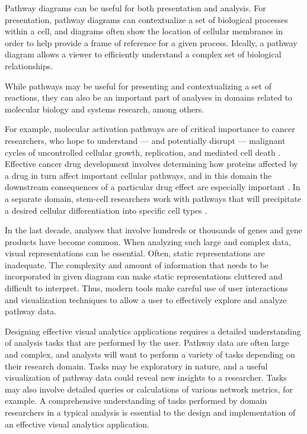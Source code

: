 \documentclass{egpubl}
\begin{document}

Pathway diagrams can be useful for both presentation and analysis.
For presentation, pathway diagrams can contextualize a set of biological processes within a cell, and diagrams often show the location of cellular membranes in order to help provide a frame of reference for a given process.
Ideally, a pathway diagram allows a viewer to efficiently understand a complex set of biological relationships.


While pathways may be useful for presenting and contextualizing a set of reactions, they can also be an important part of analyses in domains related to molecular biology and systems research, among others.

For example, molecular activation pathways are of critical importance to cancer researchers, who hope to understand --- and potentially disrupt --- malignant cycles of uncontrolled cellular growth, replication, and mediated cell death \cite{cairns2011regulation}.
Effective cancer drug development involves determining how proteins affected by a drug in turn affect important cellular pathways, and in this domain the downstream consequences of a particular drug effect are especially important \cite{luo2003targeting}.
In a separate domain, stem-cell researchers work with pathways that will precipitate a desired cellular differentiation into specific cell types \cite{reya2001stem}.


In the last decade, analyses that involve hundreds or thousands of genes and gene products have become common.
When analyzing such large and complex data, visual representations can be essential.
Often, static representations are inadequate.
The complexity and amount of information that needs to be incorporated in given diagram can make static representations cluttered and difficult to interpret.
Thus, modern tools make careful use of user interactions and visualization techniques to allow a user to effectively explore and analyze pathway data.


Designing effective visual analytics applications requires a detailed understanding of analysis tasks that are performed by the user.
Pathway data are often large and complex, and analysts will want to perform a variety of tasks depending on their research domain.
Tasks may be exploratory in nature, and a useful visualization of pathway data could reveal new insights to a researcher.
Tasks may also involve detailed queries or calculations of various network metrics, for example.
A comprehensive understanding of tasks performed by domain researchers in a typical analysis is essential to the design and implementation of an effective visual analytics application.
\end{document}
